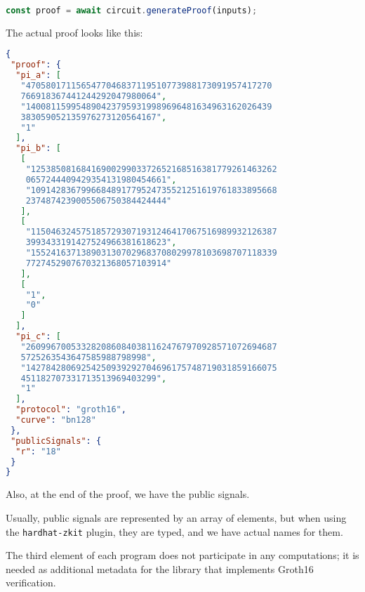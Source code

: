 \documentclass[../lecture-notes-105x135.tex]{subfiles}
\begin{document}
    \begin{lstlisting}[language=TypeScript,numbers=none]
    const proof = await circuit.generateProof(inputs);
    \end{lstlisting}

    The actual proof looks like this:
    \begin{center}
        \begin{tcolorbox}[enhanced,
            width=0.925\textwidth,
            title=\textbf{proof.json},
            coltitle=gray!25!black,
            attach boxed title to top center={yshift=-2mm,yshifttext=-1mm},
            boxed title style={size=small,colframe=gray!75!black,
            colback=purple!30!white,boxrule=1pt},
            top=-0.35cm,
            bottom=-0.35cm]
            \begin{lstlisting}[language=JSON,numbers=none,basicstyle=\ttfamily\scriptsize]
{
 "proof": {
  "pi_a": [
   "4705801711565477046837119510773988173091957417270
   766918367441244292047980064",
   "1400811599548904237959319989696481634963162026439
   383059052135976273120564167",
   "1"
  ],
  "pi_b": [
   [
    "1253850816841690029903372652168516381779261463262
    0657244409429354131980454661",
    "1091428367996684891779524735521251619761833895668
    2374874239005506750384424444"
   ],
   [
    "1150463245751857293071931246417067516989932126387
    3993433191427524966381618623",
    "1552416371389031307029683708029978103698707118339
    7727452907670321368057103914"
   ],
   [
    "1",
    "0"
   ]
  ],
  "pi_c": [
   "26099670053328208608403811624767970928571072694687
   5725263543647585988798998",
   "14278428069254250939292704696175748719031859166075
   451182707331713513969403299",
   "1"
  ],
  "protocol": "groth16",
  "curve": "bn128"
 },
 "publicSignals": {
  "r": "18"
 }
}
            \end{lstlisting}
        \end{tcolorbox}
    \end{center}

    Also, at the end of the proof, we have the public signals.

    \begin{remark}
        Usually, public signals are represented by an array of elements, but when using the \texttt{hardhat-zkit} plugin,
        they are typed, and we have actual names for them.
    \end{remark}

    The third element of each program does not participate in any computations; it is needed as additional metadata for the library that implements Groth16 verification.
\end{document}
